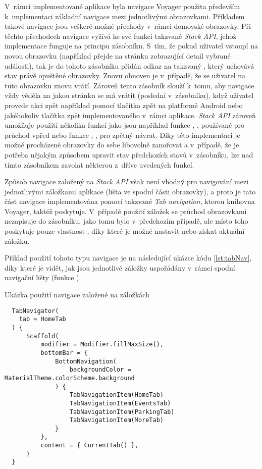 V~rámci implementované aplikace byla navigace Voyager použita především k~implementaci základní navigace mezi jednotlivými obrazovkami.
Příkladem takové navigace jsou veškeré možné přechody v~rámci domovské obrazovky. Při těchto přechodech navigace vyžívá ke své funkci takzvané 
\textit{Stack API}, jehož implementace funguje na principu zásobníku. \cite{voyagerStack} S~tím, že pokud uživatel vstoupí na novou obrazovku 
(například přejde na stránku zobrazující detail vybrané události), tak je do tohoto zásobníku přidán odkaz na takzvaný ,
který uchovává stav právě opuštěné obrazovky. Znovu obnoven je v~případě, že se uživatel na tuto obrazovku znovu vrátí. Zároveň tento
zásobník slouží k~tomu, aby navigace vždy věděla na jakou stránku se má vrátit (poslední v~zásobníku), když uživatel provede akci zpět
například pomocí tlačítka zpět na platformě Android nebo jakéhokoliv tlačítka zpět implementovaného v~rámci aplikace. \textit{Stack API}
 zároveň umožňuje použití několika funkcí jako jsou například funkce , ,  používané pro průchod vpřed 
 nebo funkce , ,  pro zpětný návrat. \cite{voyagerStack}
Díky této implementaci je možné procházené obrazovky do sebe libovolně zanořovat a v~případě, že je potřeba nějakým způsobem upravit
stav předchozích stavů v~zásobníku, lze nad tímto zásobníkem zavolat některou z~dříve uvedených funkcí.

\medskip

Způsob navigace založený na \textit{Stack API} však není vhodný pro navigování mezi jednotlivými záložkami aplikace (lišta ve spodní 
části obrazovky), a proto je tato část navigace implementována pomocí takzvané \textit{Tab navigation}, kterou knihovna Voyager, taktéž poskytuje. \cite{voyagerTab}
V~případě použití záložek se průchod obrazovkami nezapisuje do zásobníku, jako tomu bylo v~předchozím případě, ale místo toho poskytuje pouze vlastnost 
, díky které je možné nastavit nebo získat aktuální záložku. \cite{voyagerTabNav} 

\medskip

Příklad použití tohoto typu navigace je na následující ukázce kódu \ref{lst:tabNav}, díky které je vidět, jak jsou jednotlivé záložky 
uspořádány v~rámci spodní navigační lišty (funkce ).

\begin{listing}[H]
\caption{Ukázka použití navigace založené na záložkách}\label{lst:tabNav}
\begin{verbatim}
  TabNavigator(
    tab = HomeTab
  ) {
      Scaffold(
          modifier = Modifier.fillMaxSize(),
          bottomBar = {
              BottomNavigation(
                  backgroundColor = MaterialTheme.colorScheme.background
              ) {
                  TabNavigationItem(HomeTab)
                  TabNavigationItem(EventsTab)
                  TabNavigationItem(ParkingTab)
                  TabNavigationItem(MoreTab)
              }
          },
          content = { CurrentTab() },
      )
  }
\end{verbatim}
\end{listing}

